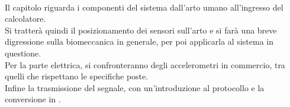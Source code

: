 {\bfseries
\vspace{1in}

\paragraph{}
Il capitolo riguarda i componenti del sistema
dall'arto umano
all'ingresso del calcolatore. 
\\

Si tratter\`a quindi il posizionamento dei sensori sull'arto
e si far\`a una breve digressione sulla biomeccanica in generale,
per poi applicarla al sistema in questione.
\\

Per la parte elettrica, si confronteranno degli accelerometri
in commercio, tra quelli che rispettano le specifiche poste.
\\

Infine la trasmissione del segnale, con un'introduzione al protocollo \iic{} e la conversione in \usb{}.

\vfill
}